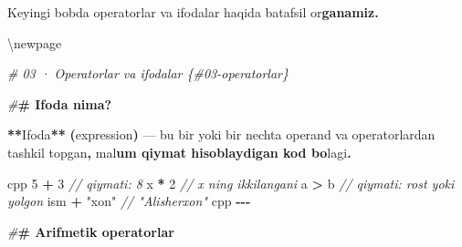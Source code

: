 \documentclass[a4paper,11pt,twoside,openright]{book}
\newenvironment{Shaded}{\begin{snugshade}}{\end{snugshade}}
\newcommand{\CharTok}[1]{\textcolor[rgb]{0.31,0.60,0.02}{#1}}
\newcommand{\CommentTok}[1]{\textcolor[rgb]{0.56,0.35,0.01}{\textit{#1}}}
\newcommand{\DecValTok}[1]{\textcolor[rgb]{0.00,0.00,0.81}{#1}}
\newcommand{\ErrorTok}[1]{\textcolor[rgb]{0.64,0.00,0.00}{\textbf{#1}}}
\newcommand{\NormalTok}[1]{#1}
\newcommand{\OperatorTok}[1]{\textcolor[rgb]{0.81,0.36,0.00}{\textbf{#1}}}
\newcommand{\PreprocessorTok}[1]{\textcolor[rgb]{0.56,0.35,0.01}{\textit{#1}}}
\newcommand{\StringTok}[1]{\textcolor[rgb]{0.31,0.60,0.02}{#1}}
\begin{document}
\begin{Shaded}
\begin{Highlighting}[]
\NormalTok{Keyingi bobda operatorlar va ifodalar haqida batafsil o}\CharTok{\textquotesingle{}r}\ErrorTok{ganamiz.}


\NormalTok{\textbackslash{}newpage}

\PreprocessorTok{\# 03 · Operatorlar va ifodalar \{\#03{-}operatorlar\}}

\PreprocessorTok{\#}\ErrorTok{\# Ifoda nima?}

\OperatorTok{**}\NormalTok{Ifoda}\OperatorTok{**} \OperatorTok{(}\NormalTok{expression}\OperatorTok{)}\NormalTok{ — bu bir yoki bir nechta operand va operatorlardan tashkil topgan}\OperatorTok{,}\NormalTok{ ma}\CharTok{\textquotesingle{}l}\ErrorTok{um qiymat hisoblaydigan kod bo}\CharTok{\textquotesingle{}}\NormalTok{lagi}\OperatorTok{.}

\ErrorTok{\textasciigrave{}\textasciigrave{}\textasciigrave{}}\NormalTok{cpp}
\DecValTok{5} \OperatorTok{+} \DecValTok{3}        \CommentTok{// qiymati: 8}
\NormalTok{x }\OperatorTok{*} \DecValTok{2}        \CommentTok{// x ning ikkilangani}
\NormalTok{a }\OperatorTok{\textgreater{}}\NormalTok{ b        }\CommentTok{// qiymati: rost yoki yolg\textquotesingle{}on}
\NormalTok{ism }\OperatorTok{+} \StringTok{"xon"}  \CommentTok{// "Alisherxon"}
\ErrorTok{\textasciigrave{}\textasciigrave{}\textasciigrave{}}\NormalTok{cpp}
\OperatorTok{{-}{-}{-}}

\PreprocessorTok{\#}\ErrorTok{\# Arifmetik operatorlar}


\end{Highlighting}
\end{Shaded}
\end{document}
